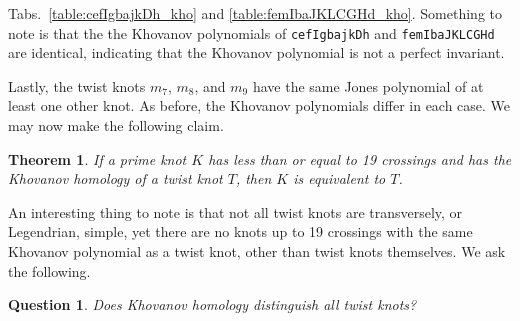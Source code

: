 \documentclass{article}
\theoremstyle{plain}
\newtheorem{theorem}{Theorem}
\newtheorem{question}{Question}
\begin{document}
        Tabs.~\ref{table:cefIgbajkDh_kho} and
        \ref{table:femIbaJKLCGHd_kho}. Something to note is that the
        the Khovanov polynomials of \texttt{cefIgbajkDh} and
        \texttt{femIbaJKLCGHd} are identical, indicating that the
        Khovanov polynomial is not a perfect invariant.
        \par\hfill\par
        Lastly, the twist knots $m_{7}$, $m_{8}$, and $m_{9}$ have the same
        Jones polynomial of at least one other knot. As before, the Khovanov
        polynomials differ in each case. We may now make the following claim.
        \begin{theorem}
            If a prime knot $K$ has less than or equal to 19 crossings and has
            the Khovanov homology of a twist knot $T$,
            then $K$ is equivalent to $T$.
        \end{theorem}
        An interesting thing to note is that not all twist knots are
        transversely, or Legendrian, simple, yet there are no knots up to
        19 crossings with the same Khovanov polynomial as a twist knot,
        other than twist knots themselves. We ask the following.
        \begin{question}
            Does Khovanov homology distinguish all twist knots?
        \end{question}
\end{document}
